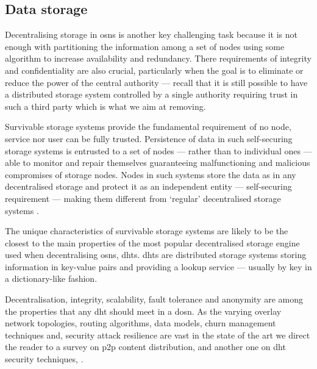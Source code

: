 \subsection{Data storage}
    \label{subsection:thesis:data-storage}
Decentralising storage in \acp{osn} is another key challenging 
task because it is not enough with partitioning the information among a set of nodes 
using some algorithm to increase availability and redundancy. There requirements 
of integrity and confidentiality are also crucial, particularly when the goal is 
to eliminate or reduce the power of the central authority --- recall that it is 
still possible to have a distributed storage system controlled by a single authority 
requiring trust in such a third party which is what we aim at removing.

Survivable storage systems provide the fundamental requirement of no node, service 
nor user can be fully trusted. Persistence of data in such self-securing storage 
systems is entrusted to a set of nodes --- rather than to individual ones --- able 
to monitor and repair themselves guaranteeing malfunctioning and malicious compromises 
of storage nodes. Nodes in such systems store the data as in any decentralised storage 
and protect it as an independent entity --- self-securing requirement --- making 
them different from `regular' decentralised storage systems \cite{WylieBSGKK00}.
 
The unique characteristics of survivable storage systems are likely to be the closest 
to the main properties of the most popular decentralised storage engine used when 
decentralising \acp{osn}, \acp{dht}. \acp{dht} are distributed storage systems storing 
information in key-value pairs and providing a lookup service --- usually by key 
in a dictionary-like fashion.

Decentralisation, integrity, scalability, fault tolerance and anonymity are among 
the properties that any \ac{dht} should meet in a \ac{dosn}. As the varying overlay 
network topologies, routing algorithms, data models, churn management techniques and, 
security attack resilience are vast in the state of the art we direct the reader 
to a survey on \ac{p2p} content distribution, \cite{Androutsellis-TheotokisSLS10} 
and another one on \ac{dht} security techniques, \cite{UrdanetaPS11}.



